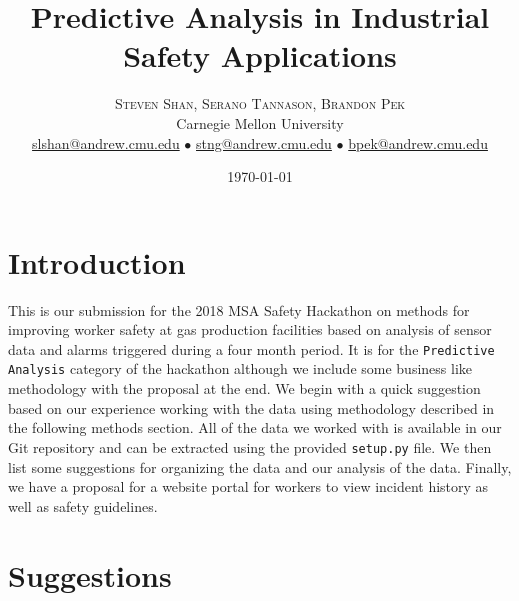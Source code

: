 \documentclass[twoside,twocolumn]{article}
\title{Predictive Analysis in Industrial Safety Applications} %
\author{%
\textsc{Steven Shan, Serano Tannason, Brandon Pek} \\[1ex] %
\normalsize Carnegie Mellon University \\ %
\normalsize \href{mailto:slshan@andrew.cmu.edu}{slshan@andrew.cmu.edu}
$\bullet$
\normalsize \href{mailto:stng@andrew.cmu.edu}{stng@andrew.cmu.edu}
$\bullet$
\normalsize \href{mailto:bpek@andrew.cmu.edu}{bpek@andrew.cmu.edu}
}
\date{\today} %
\begin{document}
\maketitle


\section{Introduction}

This is our submission for the 2018 MSA Safety Hackathon on methods for improving worker safety at gas production facilities based on analysis of sensor data and alarms triggered during a four month period. It is for the \texttt{Predictive Analysis} category of the hackathon although we include some business like methodology with the proposal at the end. We begin with a quick suggestion based on our experience working with the data using methodology described in the following methods section. All of the data we worked with is available in our Git repository and can be extracted using the provided \texttt{setup.py} file. We then list some suggestions for organizing the data and our analysis of the data. Finally, we have a proposal for a website portal for workers to view incident history as well as safety guidelines.


\section{Suggestions}
\end{document}
